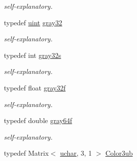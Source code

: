 \begin{DoxyCompactItemize}
\begin{DoxyCompactList}\small\item\em self-\/explanatory. \end{DoxyCompactList}\item 
\hypertarget{group___color_types_gaaea3b22bdc6fbbc1f8d7d53f0ba8f098}{typedef \hyperlink{group___eigen_typedefs_ga91ad9478d81a7aaf2593e8d9c3d06a14}{uint} \hyperlink{group___color_types_gaaea3b22bdc6fbbc1f8d7d53f0ba8f098}{gray32}}\label{group___color_types_gaaea3b22bdc6fbbc1f8d7d53f0ba8f098}

\begin{DoxyCompactList}\small\item\em self-\/explanatory. \end{DoxyCompactList}\item 
\hypertarget{group___color_types_gac9a11db63526348331dcb825f6830989}{typedef int \hyperlink{group___color_types_gac9a11db63526348331dcb825f6830989}{gray32s}}\label{group___color_types_gac9a11db63526348331dcb825f6830989}

\begin{DoxyCompactList}\small\item\em self-\/explanatory. \end{DoxyCompactList}\item 
\hypertarget{group___color_types_ga9c8a72eb9c04233172157ab5e7d0be22}{typedef float \hyperlink{group___color_types_ga9c8a72eb9c04233172157ab5e7d0be22}{gray32f}}\label{group___color_types_ga9c8a72eb9c04233172157ab5e7d0be22}

\begin{DoxyCompactList}\small\item\em self-\/explanatory. \end{DoxyCompactList}\item 
\hypertarget{group___color_types_gaf5100147ede5b7f434dc4238668a3c13}{typedef double \hyperlink{group___color_types_gaf5100147ede5b7f434dc4238668a3c13}{gray64f}}\label{group___color_types_gaf5100147ede5b7f434dc4238668a3c13}

\begin{DoxyCompactList}\small\item\em self-\/explanatory. \end{DoxyCompactList}\item 
\hypertarget{group___color_types_ga018b76cd00a4f9dca7dd06246d5bd3aa}{typedef Matrix$<$ \hyperlink{group___eigen_typedefs_ga65f85814a8290f9797005d3b28e7e5fc}{uchar}, 3, 1 $>$ \hyperlink{group___color_types_ga018b76cd00a4f9dca7dd06246d5bd3aa}{Color3ub}}\label{group___color_types_ga018b76cd00a4f9dca7dd06246d5bd3aa}


\end{DoxyCompactItemize}
